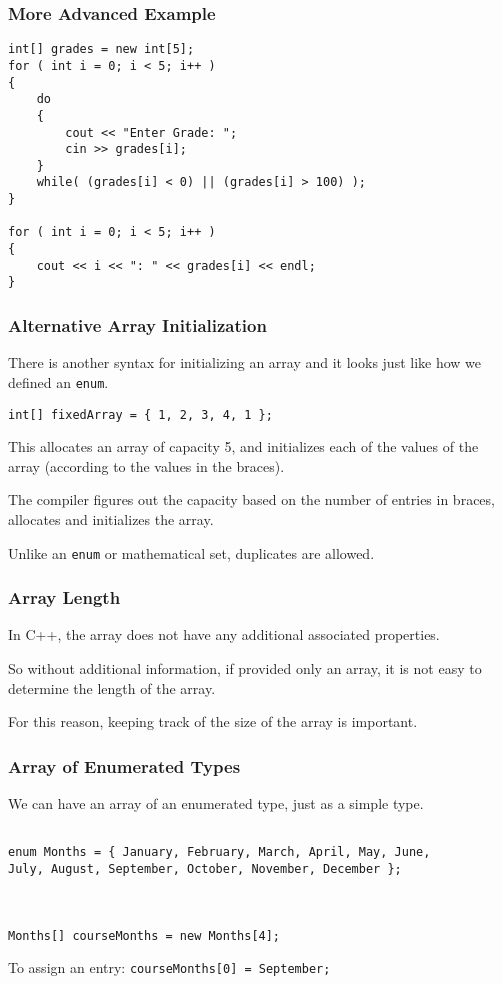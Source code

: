 \begin{frame}[fragile]
\frametitle{More Advanced Example}

{\small
\begin{verbatim}
int[] grades = new int[5];
for ( int i = 0; i < 5; i++ )
{
    do
    {
        cout << "Enter Grade: ";
        cin >> grades[i];
    }
    while( (grades[i] < 0) || (grades[i] > 100) );
}

for ( int i = 0; i < 5; i++ )
{
    cout << i << ": " << grades[i] << endl;
}
\end{verbatim}
}
\end{frame}

\begin{frame}
\frametitle{Alternative Array Initialization}

There is another syntax for initializing an array and it looks just like how we defined an \texttt{enum}.

\texttt{int[] fixedArray = \{ 1, 2, 3, 4, 1 \};}

This allocates an array of capacity 5, and initializes each of the values of the array (according to the values in the braces).

The compiler figures out the capacity based on the number of entries in braces, allocates and initializes the array.

Unlike an \texttt{enum} or mathematical set, duplicates are allowed.

\end{frame}



\begin{frame}
\frametitle{Array Length}

In C++, the array does not have any additional associated properties.

So without additional information, if provided only an array, it is not easy to determine the length of the array.

For this reason, keeping track of the size of the array is important.

\end{frame}



\begin{frame}[fragile]
\frametitle{Array of Enumerated Types}

We can have an array of an enumerated type, just as a simple type.

\begin{verbatim}

enum Months = { January, February, March, April, May, June, 
July, August, September, October, November, December };



Months[] courseMonths = new Months[4];

\end{verbatim}

To assign an entry: \texttt{courseMonths[0] = September;}

\end{frame}


